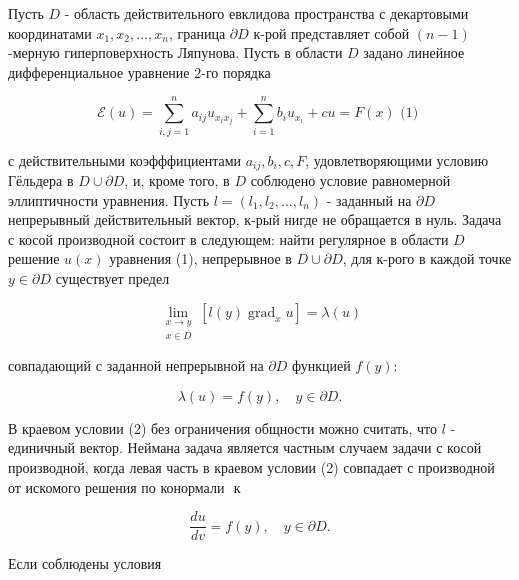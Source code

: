 \documentclass[10pt]{article}
\begin{document}
Пусть $D$ - область действительного евклидова пространства с декартовыми координатами $x_{1}, x_{2}, \ldots, x_{n}$, граница $\partial D$ к-рой представляет собой $(n-1)$-мерную гиперповерхность Ляпунова. Пусть в области $D$ задано линейное дифференциальное уравнение 2-го порядка



\[

\mathscr{E}(u)=\sum_{i, j=1}^{n} a_{i j} u_{x_{i} x_{j}}+\sum_{i=1}^{n} b_{i} u_{x_{i}}+c u=F(x) \text { (1) }

\]



с действительными коэфффициентами $a_{i j}, b_{i}, c, F$, удовлетворяющими условию Гёльдера в $D \cup \partial D$, и, кроме того, в $D$ соблюдено условие равномерной эллиптичности уравнения. Пусть $l=\left(l_{1}, l_{2}, \ldots, l_{n}\right)$ - заданный на $\partial D$ непрерывный действительный вектор, к-рый нигде не обращается в нуль. Задача с косой производной состоит в следующем: найти регулярное в области $D$ решение $u(x)$ уравнения (1), непрерывное в $D \cup \partial D$, для к-рого в каждой точке $y \in \partial D$ существует предел



\[

\lim _{\substack{x \rightarrow y \\ x \in D}}\left[l(y) \operatorname{grad}_{x} u\right]=\lambda(u)

\]



совпадающий с заданной непрерывной на $\partial D$ функцией $f(y):$



\[

\lambda(u)=f(y), \quad y \in \partial D .

\]



В краевом условии (2) без ограничения общности можно считать, что $l$ - единичный вектор. Неймана задача является частным случаем задачи с косой производной, когда левая часть в краевом условии (2) совпадает с производной от искомого решения по конормали $\boldsymbol{\text { к }}$



\[

\frac{d u}{d v}=f(y), \quad y \in \partial D .

\]



Если соблюдены условия
\end{document}
